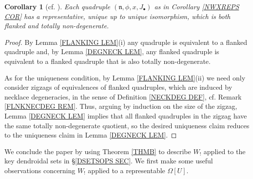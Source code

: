 \documentclass[a4paper,10pt
,draft
]{article}%
\numberwithin{equation}{section}
\numberwithin{figure}{section}
\newtheorem{corollary}[equation]{Corollary}%
\theoremstyle{definition} %
\newcommand{\1}{\ensuremath{\mathbbm 1}}%
\begin{document}
\begin{corollary}[{cf. \cite[Cor. 4.8]{DS11}}]
        \label{NWXREPS2_COR}
	Each quadruple $(\mathfrak{n},\phi,x,J_{\bullet})$ as in Corollary \ref{NWXREPS COR}
	has a representative, unique up to unique isomorphism,
	which is both flanked and totally non-degenerate.
\end{corollary}



\begin{proof}
	By Lemma \ref{FLANKING LEM}(i)
	any quadruple is equivalent to a flanked quadruple 
	and, by Lemma \ref{DEGNECK LEM},
	any flanked quadruple is equivalent to a flanked quadruple that is also totally non-degenerate.
	
	As for the uniqueness condition, 
	by Lemma \ref{FLANKING LEM}(ii)
	we need only consider zigzags of 
	equivalences of flanked quadruples, 
	which are induced by necklace degeneracies, 
	in the sense of Definition \ref{NECKDEG DEF},
	cf. Remark \ref{FLNKNECDEG REM}.
	Thus, arguing by induction on the size of the zigzag,
	Lemma \ref{DEGNECK LEM} implies that 
	all flanked quadruples in the zigzag have the same
	totally non-degenerate quotient,
	so the desired uniqueness claim reduces to the uniqueness claim
	in Lemma \ref{DEGNECK LEM}.
\end{proof}




We conclude the paper by using Theorem \ref{THMB}
to describe $W_!$ applied to the 
key dendroidal sets in \S \ref{DSETSOPS SEC}.
We first make some useful observations
concerning $W_!$ applied to a representable $\Omega[U]$. 
\end{document}
